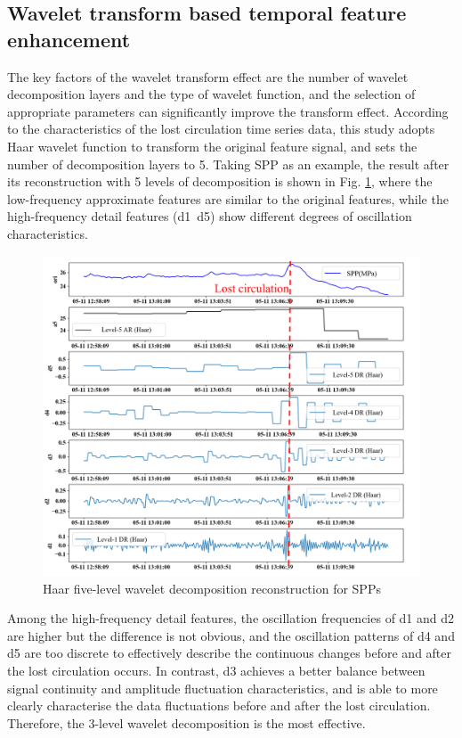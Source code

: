 \documentclass[journal,article,submit,pdftex,moreauthors]{Definitions/mdpi}
\begin{document}
\subsection{Wavelet transform based temporal feature enhancement}

The key factors of the wavelet transform effect are the number of wavelet decomposition layers and the type of wavelet function, and the selection of appropriate parameters can significantly improve the transform effect. According to the characteristics of the lost circulation time series data, this study adopts Haar wavelet function to transform the original feature signal, and sets the number of decomposition layers to 5. Taking SPP as an example, the result after its reconstruction with 5 levels of decomposition is shown in Fig.  \ref{fig:Haar five-level wavelet decomposition reconstruction for SPPs}, where the low-frequency approximate features are similar to the original features, while the high-frequency detail features (d1~d5) show different degrees of oscillation characteristics.

\begin{figure}[h]
    \centering
    \includegraphics[width=0.75\linewidth]{图片/5级小波分解.png}
    \caption{Haar five-level wavelet decomposition reconstruction for SPPs}
    \label{fig:Haar five-level wavelet decomposition reconstruction for SPPs}
\end{figure}

Among the high-frequency detail features, the oscillation frequencies of d1 and d2 are higher but the difference is not obvious, and the oscillation patterns of d4 and d5 are too discrete to effectively describe the continuous changes before and after the lost circulation occurs. In contrast, d3 achieves a better balance between signal continuity and amplitude fluctuation characteristics, and is able to more clearly characterise the data fluctuations before and after the lost circulation. Therefore, the 3-level wavelet decomposition is the most effective.
\end{document}
